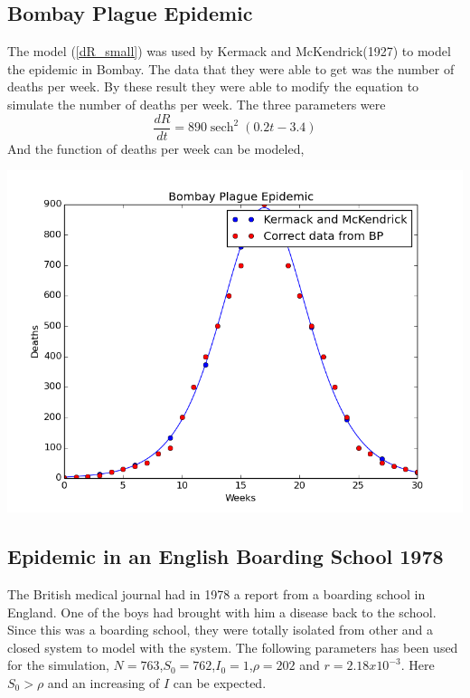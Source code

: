 \documentclass[%
twoside,                 %
final,                   %
10pt]{article}
\begin{document}
\subsection{Bombay Plague Epidemic}
The model (\ref{dR_small}) was used by Kermack and McKendrick(1927) to model the epidemic in Bombay. The data that they were able to get was the number of deaths per week. By these result they were able to modify the equation to simulate the number of deaths per week. The three parameters were
\DeclareMathOperator{\sech}{sech}
\begin{equation}
\frac{dR}{dt} = 890\sech^2(0.2t-3.4)
\end{equation}
And the function of deaths per week can be modeled,


\begin{center}  %
  \centerline{\includegraphics[width=0.9\linewidth]{plots/Bombay_plague.png}}
\end{center}


\subsection{Epidemic in an English Boarding School 1978}
The British medical journal had in 1978 a report from a boarding school in England. One of the boys had brought with him a disease back to the school. Since this was a boarding school, they were totally isolated from other and a closed system to model with the system. The following parameters has been used for the simulation, $N=763$,$S_0=762$,$I_0=1$,$\rho=202$ and $r=2.18 x 10^{-3}$. Here $S_0 > \rho$ and an increasing of $I$ can be expected.
\end{document}
